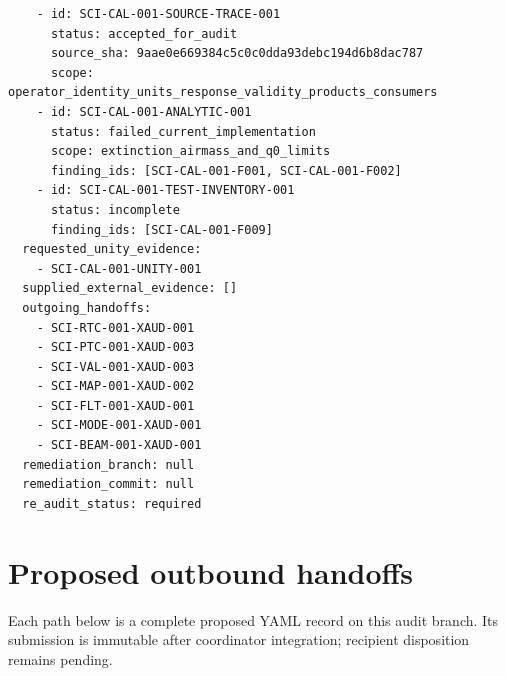 \documentclass[11pt]{article}
\begin{document}
\begin{small}
\begin{verbatim}
    - id: SCI-CAL-001-SOURCE-TRACE-001
      status: accepted_for_audit
      source_sha: 9aae0e669384c5c0c0dda93debc194d6b8dac787
      scope: operator_identity_units_response_validity_products_consumers
    - id: SCI-CAL-001-ANALYTIC-001
      status: failed_current_implementation
      scope: extinction_airmass_and_q0_limits
      finding_ids: [SCI-CAL-001-F001, SCI-CAL-001-F002]
    - id: SCI-CAL-001-TEST-INVENTORY-001
      status: incomplete
      finding_ids: [SCI-CAL-001-F009]
  requested_unity_evidence:
    - SCI-CAL-001-UNITY-001
  supplied_external_evidence: []
  outgoing_handoffs:
    - SCI-RTC-001-XAUD-001
    - SCI-PTC-001-XAUD-003
    - SCI-VAL-001-XAUD-003
    - SCI-MAP-001-XAUD-002
    - SCI-FLT-001-XAUD-001
    - SCI-MODE-001-XAUD-001
    - SCI-BEAM-001-XAUD-001
  remediation_branch: null
  remediation_commit: null
  re_audit_status: required
\end{verbatim}
\end{small}

\appendix

\section{Proposed outbound handoffs}
\label{app:handoffs}

Each path below is a complete proposed YAML record on this audit branch.  Its
submission is immutable after coordinator integration; recipient disposition
remains pending.
\end{document}
